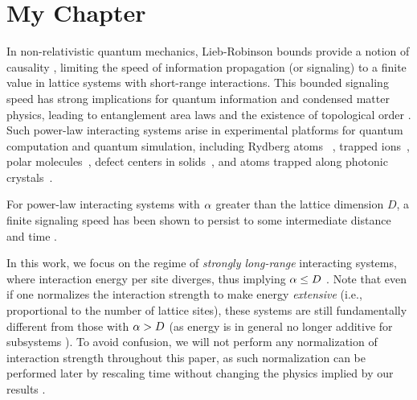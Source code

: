 \chapter{My Chapter}
In non-relativistic quantum mechanics, Lieb-Robinson bounds provide a notion of causality \cite{LR}, limiting the speed of information propagation (or signaling) to a finite value in lattice systems with short-range interactions. This bounded signaling speed has strong implications for quantum information and condensed matter physics, leading to entanglement area laws \cite{Hastings07} and the existence of topological order \cite{BravyiHM10}.
Such power-law interacting systems arise in experimental platforms for quantum computation and quantum simulation, including Rydberg atoms ~\cite{Saffman10}, trapped ions~\cite{Britton12}, polar molecules~\cite{Yan13}, defect centers in solids~\cite{Yao12}, and atoms trapped along photonic crystals~\cite{Douglas15}.

For power-law interacting systems with $\alpha$ greater than the lattice dimension $D$, a finite signaling speed has been shown to persist to some intermediate distance and time \cite{Gong14}.


In this work, we focus on the regime of \emph{strongly long-range} interacting systems, where interaction energy per site diverges, thus implying $\alpha\le D$ \cite{Kastner11,Kastner12, Storch15, Kastner17}.
Note that even if one normalizes the interaction strength to make energy \emph{extensive} (i.e., proportional to the number of lattice sites), these systems are still fundamentally different from those with $\alpha >D$ (as energy is in general no longer additive for subsystems \cite{Dauxois}).
To avoid confusion, we will not perform any normalization of interaction strength throughout this paper, as such normalization can be performed later by rescaling time  without changing the physics implied by our results \cite{Storch15}.

